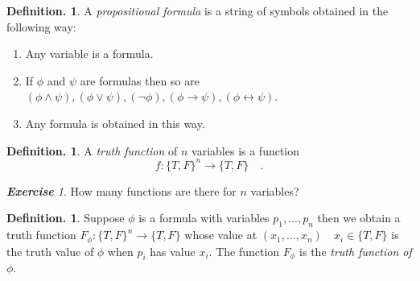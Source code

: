 \documentclass[a4paper,oneside,11pt,DIV=12,parskip=half]{scrartcl}
\theoremstyle{plain}
\theoremstyle{definition}
\newtheorem{definition}[theorem]{Definition.}
\newtheorem{remark, definition}[theorem]{Remark and Definition.}
\newtheorem{lemma, definition}[theorem]{Lemma and Definition.}
\newtheorem{theorem, definition}[theorem]{Theorem and Definition.}
\theoremstyle{remark}
\newtheorem*{exercise}{\textbf{Exercise}}
\newtheorem*{remark, example}{\textbf{Remark and Exercise}}
\begin{document}
\begin{definition}\label{Def:formula}
	A \emph{propositional formula} is a string of symbols obtained in the following way:
\begin{enumerate}
\item Any variable is a formula. \\
\item If $\phi $ and $\psi$ are formulas then so are
$(\phi \land \psi),(\phi \lor \psi), (\lnot \phi), (\phi \rightarrow \psi), (\phi \leftrightarrow \psi)$.
\item Any formula is obtained in this way.
\end{enumerate}
\end{definition}

\begin{definition}
A \emph{truth function} of $n$ variables is a function 
	\[ f: \{ T,F \}^n \rightarrow \{ T,F \} \quad. \]
\end{definition}

\begin{exercise} 
How many functions are there for $n$ variables?

\end{exercise}

\begin{definition}
Suppose $\phi$ is a formula with variables $p_1, \dots, p_n$ then we obtain a truth function $F_{\phi}: \{T,F\}^n \rightarrow \{T,F\}$ whose value at $(x_1, \dots, x_n) \quad x_i \in \{T,F\} $ is the truth value of $\phi$ when $p_i$ has value $x_i$. The function $F_{\phi}$ is the \emph{truth function of $\phi$}.
\end{definition}
\end{document}
